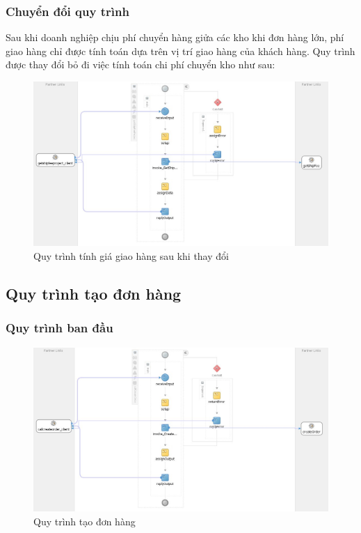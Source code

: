 \subsubsection*{Chuyển đổi quy trình}
Sau khi doanh nghiệp chịu phí chuyển hàng giửa các kho khi đơn hàng lớn, phí giao hàng chỉ được tính toán dựa trên vị trí giao hàng của khách hàng. Quy trình được thay đổi bỏ đi việc tính toán chi phí chuyển kho như sau:
\begin{figure}[!htp]
    \centering
    \includegraphics[width=12cm]{img/bpel/getShipFeeAfter.jpg}
    \newline
    \caption{Quy trình tính giá giao hàng sau khi thay đổi}
\end{figure}



\subsection{Quy trình tạo đơn hàng}
\subsubsection*{Quy trình ban đầu}
\begin{figure}[!htp]
    \centering
    \includegraphics[width=12cm]{img/bpel/createOrder.jpg}
    \newline
    \caption{Quy trình tạo đơn hàng}
\end{figure}


